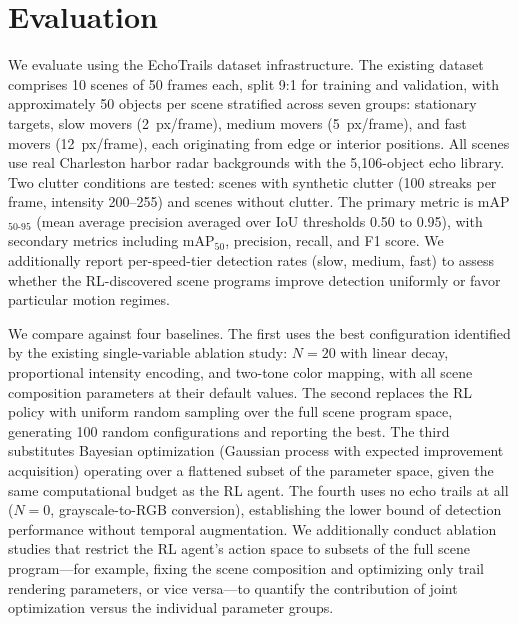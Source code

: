 \documentclass[12pt]{article}
\begin{document}
\section{Evaluation}

We evaluate using the EchoTrails dataset infrastructure. The existing dataset comprises 10 scenes of 50 frames each, split 9:1 for training and validation, with approximately 50 objects per scene stratified across seven groups: stationary targets, slow movers (2~px/frame), medium movers (5~px/frame), and fast movers (12~px/frame), each originating from edge or interior positions. All scenes use real Charleston harbor radar backgrounds with the 5,106-object echo library. Two clutter conditions are tested: scenes with synthetic clutter (100 streaks per frame, intensity 200--255) and scenes without clutter. The primary metric is mAP$_{50\text{-}95}$ (mean average precision averaged over IoU thresholds 0.50 to 0.95), with secondary metrics including mAP$_{50}$, precision, recall, and F1 score. We additionally report per-speed-tier detection rates (slow, medium, fast) to assess whether the RL-discovered scene programs improve detection uniformly or favor particular motion regimes.

We compare against four baselines. The first uses the best configuration identified by the existing single-variable ablation study: $N = 20$ with linear decay, proportional intensity encoding, and two-tone color mapping, with all scene composition parameters at their default values. The second replaces the RL policy with uniform random sampling over the full scene program space, generating 100 random configurations and reporting the best. The third substitutes Bayesian optimization (Gaussian process with expected improvement acquisition) operating over a flattened subset of the parameter space, given the same computational budget as the RL agent. The fourth uses no echo trails at all ($N = 0$, grayscale-to-RGB conversion), establishing the lower bound of detection performance without temporal augmentation. We additionally conduct ablation studies that restrict the RL agent's action space to subsets of the full scene program---for example, fixing the scene composition and optimizing only trail rendering parameters, or vice versa---to quantify the contribution of joint optimization versus the individual parameter groups.

\end{document}
